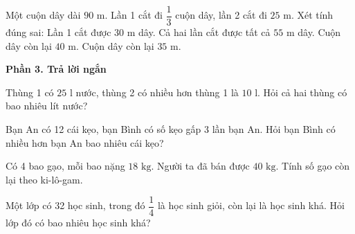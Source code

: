 \begin{ex} %
Một cuộn dây dài $90\text{ m}$. Lần 1 cắt đi $\dfrac{1}{3}$ cuộn dây, lần 2 cắt đi $25\text{ m}$. Xét tính đúng sai:
\choiceTF
{\True Lần 1 cắt được $30\text{ m}$ dây.}
{\True Cả hai lần cắt được tất cả $55\text{ m}$ dây.}
{Cuộn dây còn lại $40\text{ m}$.}
{\True Cuộn dây còn lại $35\text{ m}$.}
\end{ex}

\textbf{Phần 3. Trả lời ngắn}

\begin{ex} %
Thùng 1 có $25\text{ l}$ nước, thùng 2 có nhiều hơn thùng 1 là $10\text{ l}$. Hỏi cả hai thùng có bao nhiêu lít nước?
\end{ex}

\begin{ex} %
Bạn An có 12 cái kẹo, bạn Bình có số kẹo gấp 3 lần bạn An. Hỏi bạn Bình có nhiều hơn bạn An bao nhiêu cái kẹo?
\end{ex}

\begin{ex} %
Có 4 bao gạo, mỗi bao nặng $18\text{ kg}$. Người ta đã bán được $40\text{ kg}$. Tính số gạo còn lại theo ki-lô-gam.
\end{ex}

\begin{ex} %
Một lớp có 32 học sinh, trong đó $\dfrac{1}{4}$ là học sinh giỏi, còn lại là học sinh khá. Hỏi lớp đó có bao nhiêu học sinh khá?
\end{ex}

